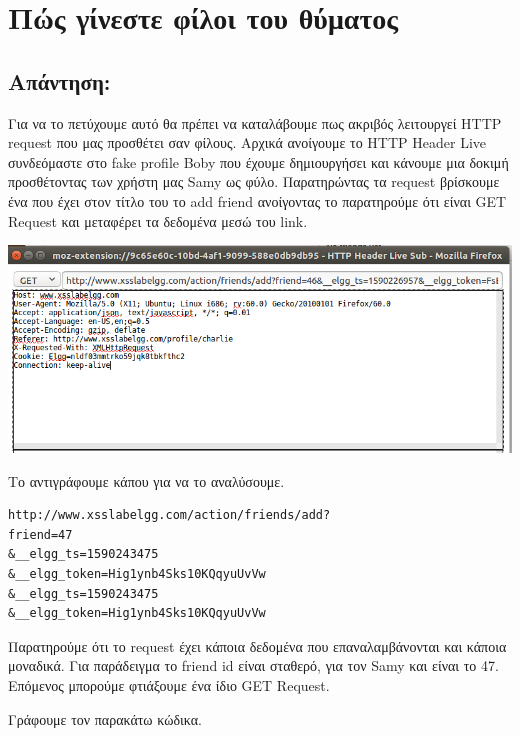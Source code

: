 \section{Πώς γίνεστε φίλοι του θύματος}
\subsection*{Απάντηση:}

\noindent
Για να το πετύχουμε αυτό θα πρέπει να καταλάβουμε πως ακριβός λειτουργεί 
HTTP request που μας προσθέτει σαν φίλους. 
Αρχικά ανοίγουμε το HTTP Header Live συνδεόμαστε στο fake profile Boby που έχουμε δημιουργήσει και κάνουμε μια δοκιμή προσθέτοντας των χρήστη μας 
Samy ως φύλο.
Παρατηρώντας τα request βρίσκουμε ένα που έχει στον τίτλο του το add friend
ανοίγοντας το παρατηρούμε ότι είναι GET Request και μεταφέρει τα δεδομένα
μεσώ του link.
\begin{center}
			\includegraphics[width=1\textwidth]{image/4.1.PNG}		
\end{center}
\noindent
Το αντιγράφουμε κάπου για να το αναλύσουμε.

\begin{center}
	\begin{lstlisting}	
http://www.xsslabelgg.com/action/friends/add?
friend=47
&__elgg_ts=1590243475
&__elgg_token=Hig1ynb4Sks10KQqyuUvVw
&__elgg_ts=1590243475
&__elgg_token=Hig1ynb4Sks10KQqyuUvVw
	\end{lstlisting}	
\end{center}
\noindent
Παρατηρούμε ότι το request έχει κάποια δεδομένα που επαναλαμβάνονται
και κάποια μοναδικά. Για παράδειγμα το friend id είναι σταθερό, για τον
Samy και είναι το 47. Επόμενος μπορούμε φτιάξουμε ένα ίδιο GET Request.

\noindent
Γράφουμε τον παρακάτω κώδικα.


